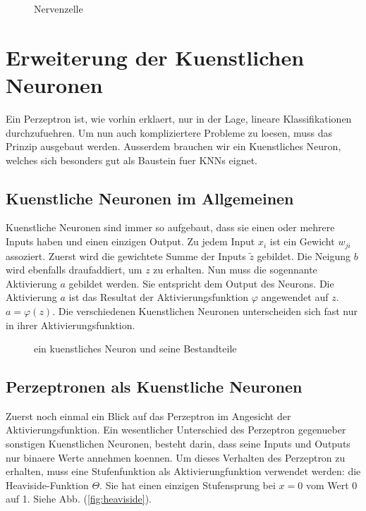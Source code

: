 
\begin{figure}[h!]

  \caption{Nervenzelle}
\end{figure}


\section{Erweiterung der Kuenstlichen Neuronen}\label{sec:kuenstlicheNeuronen}
Ein Perzeptron ist, wie vorhin erklaert, nur in der Lage, lineare Klassifikationen
durchzufuehren. Um nun auch kompliziertere Probleme zu loesen, muss das Prinzip
ausgebaut werden. Ausserdem brauchen wir ein Kuenstliches Neuron, welches sich
besonders gut als Baustein fuer KNNs eignet.

\subsection{Kuenstliche Neuronen im Allgemeinen}
Kuenstliche Neuronen sind immer so aufgebaut, dass sie einen oder mehrere Inputs
haben und einen einzigen Output. Zu jedem Input $x_i$ ist ein Gewicht
$w_{ji}$ assoziert. Zuerst wird die gewichtete Summe der Inputs $\tilde{z}$ gebildet.
Die Neigung $b$ wird ebenfalls draufaddiert, um $z$ zu erhalten. Nun muss
die sogennante Aktivierung $a$ gebildet werden. Sie entspricht dem Output des Neurons.
Die Aktivierung $a$ ist das Resultat der Aktivierungsfunktion $\varphi$ angewendet
auf $z$. $a = \varphi(z)$. Die verschiedenen Kuenstlichen Neuronen unterscheiden
sich fast nur in ihrer Aktivierungsfunktion.

\begin{figure}[h!]

  \caption{ein kuenstliches Neuron und seine Bestandteile}
\end{figure}

\subsection{Perzeptronen als Kuenstliche Neuronen}
Zuerst noch einmal ein Blick auf das Perzeptron im Angesicht der Aktivierungsfunktion.
Ein wesentlicher Unterschied des Perzeptron gegenueber sonstigen Kuenstlichen
Neuronen, besteht darin, dass seine Inputs und Outputs nur binaere Werte
annehmen koennen. Um dieses Verhalten des Perzeptron zu erhalten,
muss eine Stufenfunktion als Aktivierungfunktion verwendet werden: die Heaviside-Funktion $\Theta$.
Sie hat einen einzigen Stufensprung bei $x=0$ vom Wert 0 auf 1. Siehe Abb. (\ref{fig:heaviside}).

